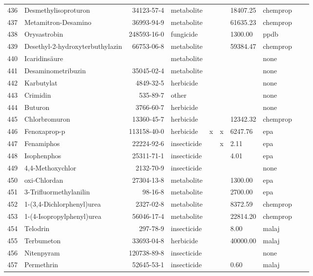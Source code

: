 \begin{longtable}{lp{3cm}rlp{0.5cm}p{0.5cm}p{1cm}p{1cm}p{1cm}p{1cm}}
  436 & Desmethylisoproturon & 34123-57-4 & metabolite &  &  & 18407.25 & chemprop &  &  \\ 
  437 & Metamitron-Desamino & 36993-94-9 & metabolite &  &  & 61635.23 & chemprop &  &  \\ 
  438 & Orysastrobin & 248593-16-0 & fungicide &  &  & 1300.00 & ppdb &  &  \\ 
  439 & Desethyl-2-hydroxyterbuthylazin & 66753-06-8 & metabolite &  &  & 59384.47 & chemprop &  &  \\ 
  440 & Icaridinsäure &  & metabolite &  &  &  & none &  &  \\ 
  441 & Desaminometribuzin & 35045-02-4 & metabolite &  &  &  & none &  &  \\ 
  442 & Karbutylat & 4849-32-5 & herbicide &  &  &  & none &  &  \\ 
  443 & Crimidin & 535-89-7 & other &  &  &  & none &  &  \\ 
  444 & Buturon & 3766-60-7 & herbicide &  &  &  & none &  &  \\ 
  445 & Chlorbromuron & 13360-45-7 & herbicide &  &  & 12342.32 & chemprop &  &  \\ 
  446 & Fenoxaprop-p & 113158-40-0 & herbicide & x & x & 6247.76 & epa &  &  \\ 
  447 & Fenamiphos & 22224-92-6 & insecticide &  & x & 2.11 & epa &  &  \\ 
  448 & Isophenphos & 25311-71-1 & insecticide &  &  & 4.01 & epa &  &  \\ 
  449 & 4,4-Methoxychlor & 2132-70-9 & insecticide &  &  &  & none &  &  \\ 
  450 & oxi-Chlordan & 27304-13-8 & metabolite &  &  & 1300.00 & epa &  &  \\ 
  451 & 3-Trifluormethylanilin & 98-16-8 & metabolite &  &  & 2700.00 & epa &  &  \\ 
  452 & 1-(3,4-Dichlorphenyl)urea & 2327-02-8 & metabolite &  &  & 8372.59 & chemprop &  &  \\ 
  453 & 1-(4-Isopropylphenyl)urea & 56046-17-4 & metabolite &  &  & 22814.20 & chemprop &  &  \\ 
  454 & Telodrin & 297-78-9 & insecticide &  &  & 8.00 & malaj &  &  \\ 
  455 & Terbumeton & 33693-04-8 & herbicide &  &  & 40000.00 & malaj &  &  \\ 
  456 & Nitenpyram & 120738-89-8 & insecticide &  &  &  & none &  &  \\ 
  457 & Permethrin & 52645-53-1 & insecticide &  &  & 0.60 & malaj &  &  \\ 

\end{longtable}
